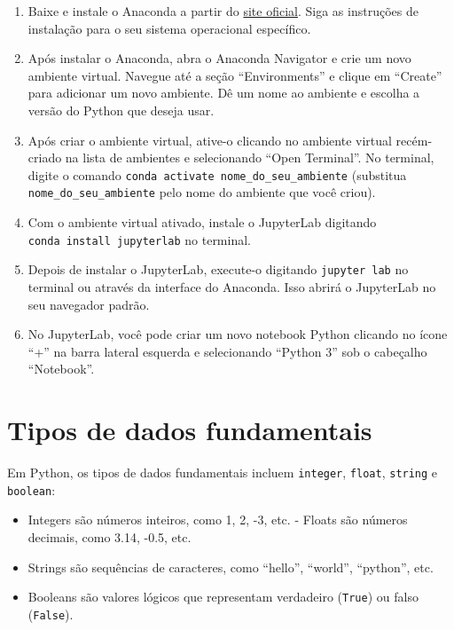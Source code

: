 \documentclass[
  portuguese,
  letterpaper,
  DIV=11,
  numbers=noendperiod]{scrreprt}
\providecommand{\tightlist}{%
  \setlength{\itemsep}{0pt}\setlength{\parskip}{0pt}}
\theoremstyle{definition}
\theoremstyle{remark}
\begin{document}
\begin{enumerate}
\def\labelenumi{\arabic{enumi}.}
\item
  Baixe e instale o Anaconda a partir do
  \href{https://www.anaconda.com/products/distribution}{site oficial}.
  Siga as instruções de instalação para o seu sistema operacional
  específico.
\item
  Após instalar o Anaconda, abra o Anaconda Navigator e crie um novo
  ambiente virtual. Navegue até a seção ``Environments'' e clique em
  ``Create'' para adicionar um novo ambiente. Dê um nome ao ambiente e
  escolha a versão do Python que deseja usar.
\item
  Após criar o ambiente virtual, ative-o clicando no ambiente virtual
  recém-criado na lista de ambientes e selecionando ``Open Terminal''.
  No terminal, digite o comando
  \texttt{conda\ activate\ nome\_do\_seu\_ambiente} (substitua
  \texttt{nome\_do\_seu\_ambiente} pelo nome do ambiente que você
  criou).
\item
  Com o ambiente virtual ativado, instale o JupyterLab digitando
  \texttt{conda\ install\ jupyterlab} no terminal.
\item
  Depois de instalar o JupyterLab, execute-o digitando
  \texttt{jupyter\ lab} no terminal ou através da interface do Anaconda.
  Isso abrirá o JupyterLab no seu navegador padrão.
\item
  No JupyterLab, você pode criar um novo notebook Python clicando no
  ícone ``+'' na barra lateral esquerda e selecionando ``Python 3'' sob
  o cabeçalho ``Notebook''.
\end{enumerate}

\section{Tipos de dados fundamentais}\label{tipos-de-dados-fundamentais}

Em Python, os tipos de dados fundamentais incluem \texttt{integer},
\texttt{float}, \texttt{string} e \texttt{boolean}:

\begin{itemize}
\tightlist
\item
  Integers são números inteiros, como 1, 2, -3, etc. - Floats são
  números decimais, como 3.14, -0.5, etc.
\item
  Strings são sequências de caracteres, como ``hello'', ``world'',
  ``python'', etc.
\item
  Booleans são valores lógicos que representam verdadeiro
  (\texttt{True}) ou falso (\texttt{False}).
\end{itemize}
\end{document}
